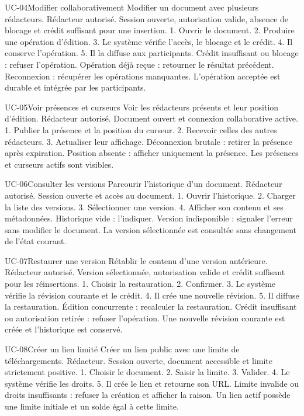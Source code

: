 \fichecas
{UC-04}{Modifier collaborativement}
{Modifier un document avec plusieurs rédacteurs.}
{Rédacteur autorisé.}
{Session ouverte, autorisation valide, absence de blocage et crédit suffisant pour une insertion.}
{1. Ouvrir le document. 2. Produire une opération d'édition. 3. Le système vérifie l'accès, le blocage et le crédit. 4. Il conserve l'opération. 5. Il la diffuse aux participants.}
{Crédit insuffisant ou blocage : refuser l'opération. Opération déjà reçue : retourner le résultat précédent. Reconnexion : récupérer les opérations manquantes.}
{L'opération acceptée est durable et intégrée par les participants.}

\fichecas
{UC-05}{Voir présences et curseurs}
{Voir les rédacteurs présents et leur position d'édition.}
{Rédacteur autorisé.}
{Document ouvert et connexion collaborative active.}
{1. Publier la présence et la position du curseur. 2. Recevoir celles des autres rédacteurs. 3. Actualiser leur affichage.}
{Déconnexion brutale : retirer la présence après expiration. Position absente : afficher uniquement la présence.}
{Les présences et curseurs actifs sont visibles.}

\fichecas
{UC-06}{Consulter les versions}
{Parcourir l'historique d'un document.}
{Rédacteur autorisé.}
{Session ouverte et accès au document.}
{1. Ouvrir l'historique. 2. Charger la liste des versions. 3. Sélectionner une version. 4. Afficher son contenu et ses métadonnées.}
{Historique vide : l'indiquer. Version indisponible : signaler l'erreur sans modifier le document.}
{La version sélectionnée est consultée sans changement de l'état courant.}

\fichecas
{UC-07}{Restaurer une version}
{Rétablir le contenu d'une version antérieure.}
{Rédacteur autorisé.}
{Version sélectionnée, autorisation valide et crédit suffisant pour les réinsertions.}
{1. Choisir la restauration. 2. Confirmer. 3. Le système vérifie la révision courante et le crédit. 4. Il crée une nouvelle révision. 5. Il diffuse la restauration.}
{Édition concurrente : recalculer la restauration. Crédit insuffisant ou autorisation retirée : refuser l'opération.}
{Une nouvelle révision courante est créée et l'historique est conservé.}

\fichecas
{UC-08}{Créer un lien limité}
{Créer un lien public avec une limite de téléchargements.}
{Rédacteur.}
{Session ouverte, document accessible et limite strictement positive.}
{1. Choisir le document. 2. Saisir la limite. 3. Valider. 4. Le système vérifie les droits. 5. Il crée le lien et retourne son URL.}
{Limite invalide ou droits insuffisants : refuser la création et afficher la raison.}
{Un lien actif possède une limite initiale et un solde égal à cette limite.}

